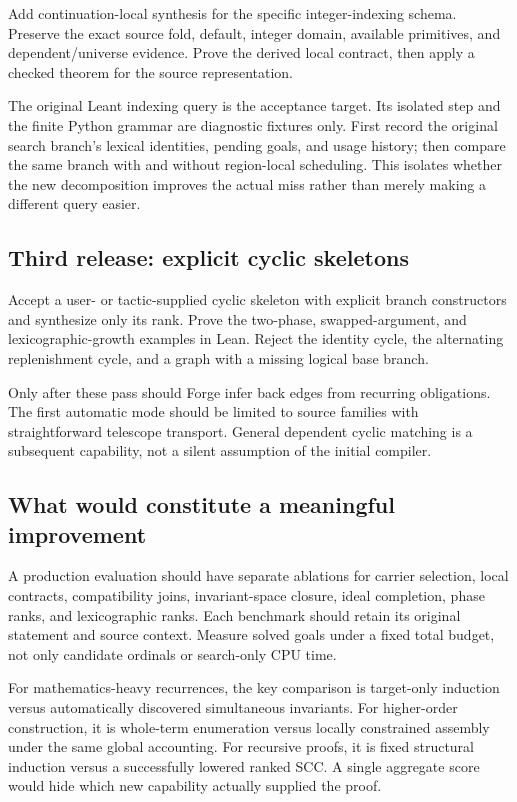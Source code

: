 Add continuation-local synthesis for the specific integer-indexing schema.
Preserve the exact source fold, default, integer domain, available primitives,
and dependent/universe evidence. Prove the derived local contract, then apply a
checked theorem for the source representation.

The original Leant indexing query is the acceptance target. Its isolated step
and the finite Python grammar are diagnostic fixtures only. First record the
original search branch's lexical identities, pending goals, and usage history;
then compare the same branch with and without region-local scheduling. This
isolates whether the new decomposition improves the actual miss rather than
merely making a different query easier.

\subsection{Third release: explicit cyclic skeletons}

Accept a user- or tactic-supplied cyclic skeleton with explicit branch constructors
and synthesize only its rank. Prove the two-phase, swapped-argument, and
lexicographic-growth examples in Lean. Reject the identity cycle, the alternating
replenishment cycle, and a graph with a missing logical base branch.

Only after these pass should Forge infer back edges from recurring obligations.
The first automatic mode should be limited to source families with straightforward
telescope transport. General dependent cyclic matching is a subsequent capability,
not a silent assumption of the initial compiler.

\subsection{What would constitute a meaningful improvement}

A production evaluation should have separate ablations for carrier selection,
local contracts, compatibility joins, invariant-space closure, ideal completion,
phase ranks, and lexicographic ranks. Each benchmark should retain its original
statement and source context. Measure solved goals under a fixed total budget,
not only candidate ordinals or search-only CPU time.

For mathematics-heavy recurrences, the key comparison is target-only induction
versus automatically discovered simultaneous invariants. For higher-order
construction, it is whole-term enumeration versus locally constrained assembly
under the same global accounting. For recursive proofs, it is fixed structural
induction versus a successfully lowered ranked SCC. A single aggregate score
would hide which new capability actually supplied the proof.

